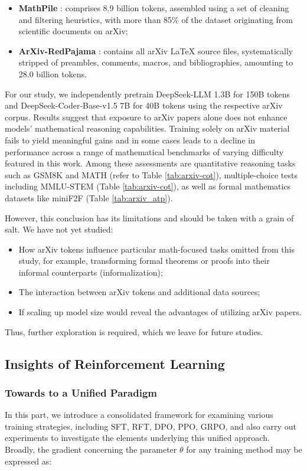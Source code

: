 \begin{itemize}[topsep=0pt]
\begin{itemize}[topsep=0pt]
\begin{itemize}[topsep=0pt]
    \item \textbf{MathPile} \citep{mathpile}: comprises 8.9 billion tokens, assembled using a set of cleaning and filtering heuristics, with more than 85\% of the dataset originating from scientific documents on arXiv;
    \item \textbf{ArXiv-RedPajama} \citep{redpajama}: contains all arXiv LaTeX source files, systematically stripped of preambles, comments, macros, and bibliographies, amounting to 28.0 billion tokens.
\end{itemize}

For our study, we independently pretrain DeepSeek-LLM 1.3B for 150B tokens and DeepSeek-Coder-Base-v1.5 7B for 40B tokens using the respective arXiv corpus. Results suggest that exposure to arXiv papers alone does not enhance models’ mathematical reasoning capabilities. Training solely on arXiv material fails to yield meaningful gains and in some cases leads to a decline in performance across a range of mathematical benchmarks of varying difficulty featured in this work. Among these assessments are quantitative reasoning tasks such as GSM8K and MATH (refer to Table \ref{tab:arxiv-cot}), multiple-choice tests including MMLU-STEM (Table \ref{tab:arxiv-cot}), as well as formal mathematics datasets like miniF2F (Table \ref{tab:arxiv_atp}).

However, this conclusion has its limitations and should be taken with a grain of salt. We have not yet studied:

\begin{itemize}[topsep=0pt]
    \item How arXiv tokens influence particular math-focused tasks omitted from this study, for example, transforming formal theorems or proofs into their informal counterparts (informalization);
    \item The interaction between arXiv tokens and additional data sources;
    \item If scaling up model size would reveal the advantages of utilizing arXiv papers.
\end{itemize}

Thus, further exploration is required, which we leave for future studies.

\subsection{Insights of Reinforcement Learning}
\subsubsection{Towards to a Unified Paradigm} In this part, we introduce a consolidated framework for examining various training strategies, including SFT, RFT, DPO, PPO, GRPO, and also carry out experiments to investigate the elements underlying this unified approach. Broadly, the gradient concerning the parameter $\theta$ for any training method may be expressed as:


\end{itemize}
\end{itemize}
